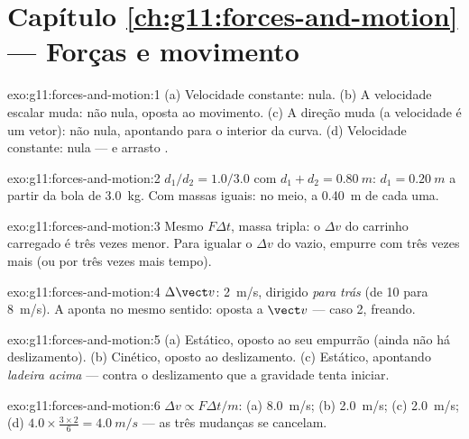 \section*{Capítulo \ref{ch:g11:forces-and-motion} --- Forças e movimento}

\begin{solution}{exo:g11:forces-and-motion:1}
(a) Velocidade constante:  nula. (b) A velocidade escalar
muda: não nula, oposta ao movimento. (c) A direção muda (a velocidade é
um vetor): não nula, apontando para o interior da curva. (d) Velocidade
constante: nula ---  e arrasto .
\end{solution}

\begin{solution}{exo:g11:forces-and-motion:2}
$d_1/d_2 = 1.0/3.0$ com $d_1 + d_2 = \qty{0.80}{m}$:
$d_1 = \qty{0.20}{m}$ a partir da bola de \qty{3.0}{kg}. Com massas
iguais: no meio, a \qty{0.40}{m} de cada uma.
\end{solution}

\begin{solution}{exo:g11:forces-and-motion:3}
Mesmo $F\Delta t$, massa tripla: o $\Delta v$ do carrinho carregado é
três vezes menor. Para igualar o $\Delta v$ do vazio, empurre com três
vezes mais  (ou por três vezes mais tempo).
\end{solution}

\begin{solution}{exo:g11:forces-and-motion:4}
$\Delta \vect v$: \qty{2}{m/s}, dirigido \emph{para trás} (de \num{10}
para \qty{8}{m/s}). A  aponta no mesmo sentido: oposta a
$\vect v$ --- caso 2, freando.
\end{solution}

\begin{solution}{exo:g11:forces-and-motion:5}
(a) Estático, oposto ao seu empurrão (ainda não há deslizamento).
(b) Cinético, oposto ao deslizamento. (c) Estático, apontando
\emph{ladeira acima} --- contra o deslizamento que a gravidade tenta
iniciar.
\end{solution}

\begin{solution}{exo:g11:forces-and-motion:6}
$\Delta v \propto F\Delta t/m$: (a) \qty{8.0}{m/s}; (b) \qty{2.0}{m/s};
(c) \qty{2.0}{m/s}; (d)
$4.0 \times \frac{3 \times 2}{6} = \qty{4.0}{m/s}$ --- as três mudanças
se cancelam.
\end{solution}

